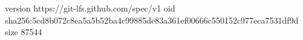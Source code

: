 version https://git-lfs.github.com/spec/v1
oid sha256:5cd8b072c8ea5a5b52ba4c99885de83a361ef00666c550152c977eca7531df9d
size 87544
